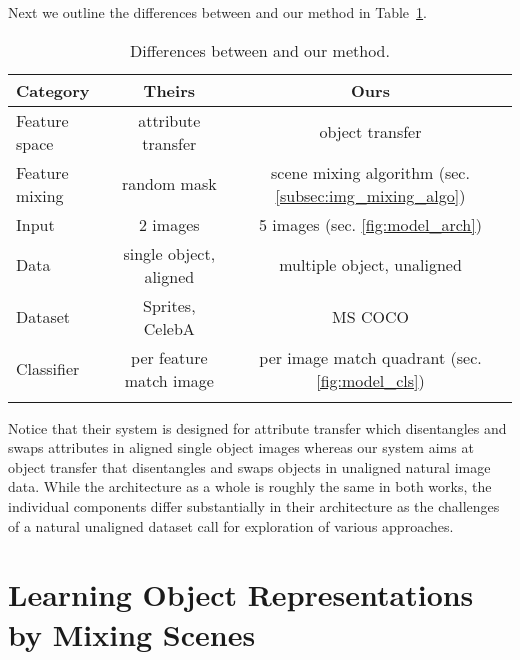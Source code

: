 \documentclass[12pt,a4paper]{article}
\begin{document}
Next we outline the differences between \cite{DisentFacOfVarByMixTh} and our method in Table~\ref{tab:diffHuVsLorbms}.
\begin{table} [H]
\centering
\begin{tabular}{l|c|c}
\Xhline{0.8pt}
\textbf{Category} & \textbf{Theirs} & \textbf{Ours}\\
\hline
Feature space & attribute transfer & object transfer\\
\hline
Feature mixing & random mask & scene mixing algorithm (sec. \ref{subsec:img_mixing_algo}) \\
\hline
Input  & 2 images & 5 images (sec. \ref{fig:model_arch}) \\
\hline
Data & single object, aligned & multiple object, unaligned\\
\hline
Dataset & Sprites, CelebA & MS COCO \\
\hline

Classifier & per feature match image & per image match quadrant (sec. \ref{fig:model_cls}) \\
\Xhline{0.8pt}
\end{tabular}
\caption{Differences between \cite{DisentFacOfVarByMixTh} and our method.} \label{tab:diffHuVsLorbms}
\end{table}
Notice that their system is designed for attribute transfer which disentangles and swaps attributes in aligned single object images whereas our system aims at object transfer that disentangles and swaps objects in unaligned natural image data. While the architecture as a whole is roughly the same in both works, the individual components differ substantially in their architecture as the challenges of a natural unaligned dataset call for exploration of various approaches.
 

%
\newpage
\section{Learning Object Representations by Mixing Scenes}\label{sec:lorbms_method}
\end{document}
